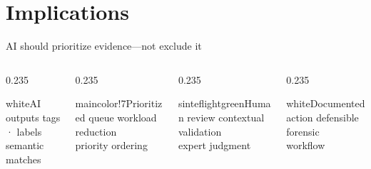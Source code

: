 \documentclass{beamer}
\begin{document}
\section{Implications}

\begin{frame}{AI should prioritize evidence---not exclude it}
\vspace{0.15cm}
\begin{columns}[T,totalwidth=\textwidth]
  \begin{column}{0.235\textwidth}
    \par
    \begin{colorblock}[black]{white}{AI outputs}
      \centering\scriptsize tags · labels\\semantic matches
    \end{colorblock}
  \end{column}
  \begin{column}{0.235\textwidth}
    \par
    \begin{colorblock}[black]{maincolor!7}{Prioritized queue}
      \centering\scriptsize workload reduction\\priority ordering
    \end{colorblock}
  \end{column}
  \begin{column}{0.235\textwidth}
    \par
    \begin{colorblock}[black]{sinteflightgreen}{Human review}
      \centering\scriptsize contextual validation\\expert judgment
    \end{colorblock}
  \end{column}
  \begin{column}{0.235\textwidth}
    \par
    \begin{colorblock}[black]{white}{Documented action}
      \centering\scriptsize defensible forensic\\workflow
    \end{colorblock}
  \end{column}
\end{columns}


\end{frame}
\end{document}
